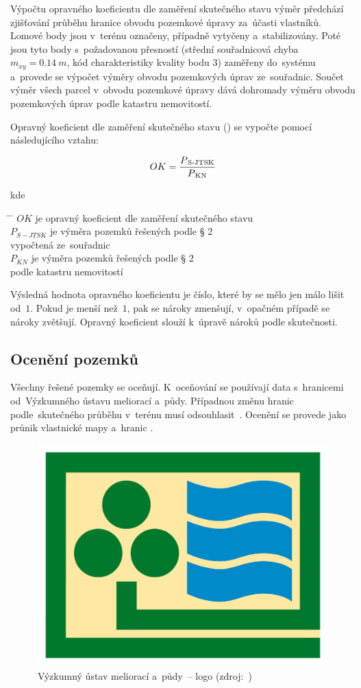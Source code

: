 Výpočtu opravného koeficientu dle zaměření skutečného stavu výměr předchází
zjišťování průběhu hranice obvodu pozemkové úpravy za~účasti vlastníků.
Lomové body jsou v~terénu označeny, případně vytyčeny a~stabilizovány.
Poté jsou tyto body s~požadovanou přesností (střední souřadnicová chyba
$m_{xy}=0.14~m$, kód charakteristiky kvality bodu $3$) zaměřeny
do~systému  a~provede se výpočet výměry obvodu pozemkových
úprav ze~souřadnic. Součet výměr všech parcel v~obvodu pozemkové
úpravy dává dohromady výměru obvodu pozemkových úprav podle katastru
nemovitostí.

Opravný koeficient dle zaměření skutečného stavu () se vypočte pomocí
následujícího vztahu:

\begin{equation} OK =
\frac{P\textsubscript{S-JTSK}}{P\textsubscript{KN}}
\end{equation}

kde
\begin{tabbing} \hspace{2em} \= \hspace{5em} \= \kill
\> $OK$ \> je opravný koeficient dle zaměření skutečného stavu \\
\> $P_{S-JTSK}$
\> je výměra pozemků řešených podle § 2 \\ \> \> vypočtená ze~souřadnic \\
\> $P_{KN}$ \> je výměra pozemků řešených podle § 2 \\ \> \> podle
katastru nemovitostí
\end{tabbing}

Výsledná hodnota opravného koeficientu je číslo, které by se mělo jen
málo lišit od~$1$. Pokud je  menší než~$1$, pak se nároky
zmenšují, v~opačném případě se nároky zvětšují. Opravný koeficient
slouží k~úpravě nároků podle skutečnosti.

\subsection{Ocenění pozemků}
\label{oceneni}

Všechny řešené pozemky se oceňují. K~oceňování se používají data
s~hranicemi  od~Výzkumného ústavu meliorací a~půdy. Případnou
změnu hranic  podle~skutečného průběhu v~terénu musí
odsouhlasit~. Ocenění se provede jako průnik vlastnické mapy
a~hranic .

	\begin{figure}[H] \centering
		\includegraphics[width=.5\textwidth]{./pictures/vumop.png}
		\caption[Výzkumný ústav meliorací a~půdy~–
logo]{Výzkumný ústav meliorací a~půdy~– logo (zdroj:~\citep{vumop})}
		\label{fig:vumop}
 	\end{figure}

